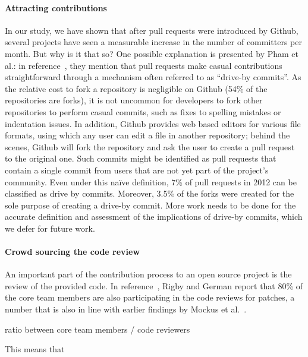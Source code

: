 \documentclass{sig-alternate}
\begin{document}
\paragraph{Attracting contributions}
In our study, we have shown that after pull requests were introduced
by Github, several projects have seen a measurable increase in the number
of committers per month. But why is it that so? One possible explanation
is presented by Pham et al.: in reference~\cite{Pham13}, they mention
that pull requests make casual contributions straightforward through
a mechanism often referred to as ``drive-by commits''. As the
relative cost to fork a repository is negligible on Github (54\% of the
repositories are forks), it is not uncommon for developers to fork other
repositories to perform casual commits, such as fixes to spelling mistakes or
indentation issues. In addition, Github provides web based editors
for various file formats, using which any user can edit a file in another
repository; behind the scenes, Github will fork the repository and ask the user
to create a pull request to the original one. Such commits might be identified
as pull requests that contain a single commit from users that are not yet part
of the project's community. Even under this na\"ive definition, 7\% of pull
requests in 2012 can be classified as drive by commits. Moreover, 3.5\% of the
forks were created for the sole purpose of creating a drive-by commit. More
work needs to be done for the accurate definition and assessment of the
implications of drive-by commits, which we defer for future work.

\paragraph{Crowd sourcing the code review}
An important part of the contribution process to an open source project is the
review of the provided code. In reference~\cite{Rigby06}, Rigby and German
report that 80\% of the core team members are also participating in the code
reviews for patches, a number that is also in line with earlier findings by
Mockus et al.~\cite{MOCKU02}. 

ratio between core team members / code reviewers

This means that 
\end{document}
